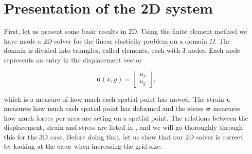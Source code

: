 \section{Presentation of the 2D system}

First, let us present some basic results in 2D. Using the finite element method we have made a 2D solver for the linear elasticity problem on a domain $\Omega$. The domain is divided into triangles, called elements, each with 3 nodes. Each node represents an entry in the displacement vector

\begin{equation}
\bm{u}(x,y) = 
\begin{bmatrix}
u_x \\
u_y
\end{bmatrix},
\end{equation}

which is a measure of how much each spatial point has moved. The strain $\bm{\epsilon}$ measures how much each spatial point has deformed and the stress $\bm{\sigma}$ measures how much forces per area are acting on a spatial point. The relations between the displacement, strain and stress are listed in \cite{note2}, and we will go thoroughly through this for the 3D case. Before doing that, let us show that our 2D solver is correct by looking at the error when increasing the grid size.



